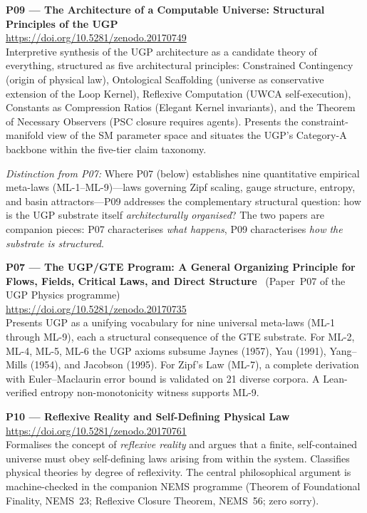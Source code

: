 \documentclass[11pt]{article}
\begin{document}
\medskip
\noindent\textbf{P09 — The Architecture of a Computable Universe: Structural
Principles of the UGP}~\cite{Spivack2025_ArchitectureComputableUniverse}\\
\url{https://doi.org/10.5281/zenodo.20170749}\\
Interpretive synthesis of the UGP architecture as a candidate theory of
everything, structured as five architectural principles: Constrained Contingency
(origin of physical law), Ontological Scaffolding (universe as conservative
extension of the Loop Kernel), Reflexive Computation (UWCA self-execution),
Constants as Compression Ratios (Elegant Kernel invariants), and the Theorem
of Necessary Observers (PSC closure requires agents).  Presents the
constraint-manifold view of the SM parameter space and situates the UGP's
Category-A backbone within the five-tier claim taxonomy.

\textit{Distinction from P07:} Where P07 (below) establishes nine quantitative
empirical meta-laws (ML-1--ML-9)---laws governing Zipf scaling, gauge
structure, entropy, and basin attractors---P09 addresses the complementary
structural question: how is the UGP substrate itself \emph{architecturally
organised}?  The two papers are companion pieces: P07 characterises
\emph{what happens}, P09 characterises \emph{how the substrate is structured}.

\medskip
\noindent\textbf{P07 — The UGP/GTE Program: A General Organizing Principle for
Flows, Fields, Critical Laws, and Direct Structure}~\cite{SpivackZipfLaw}
(Paper~P07 of the UGP Physics programme)\\
\url{https://doi.org/10.5281/zenodo.20170735}\\
Presents UGP as a unifying vocabulary for nine universal meta-laws
(ML-1 through ML-9), each a structural consequence of the GTE substrate.
For ML-2, ML-4, ML-5, ML-6 the UGP axioms subsume Jaynes (1957), Yau (1991),
Yang--Mills (1954), and Jacobson (1995).  For Zipf's Law (ML-7), a complete
derivation with Euler--Maclaurin error bound is validated on 21 diverse corpora.
A Lean-verified entropy non-monotonicity witness supports ML-9.

\medskip
\noindent\textbf{P10 — Reflexive Reality and Self-Defining Physical Law}~\cite{SpivackSelfDefiningUniverse}\\
\url{https://doi.org/10.5281/zenodo.20170761}\\
Formalises the concept of \emph{reflexive reality} and argues that a finite,
self-contained universe must obey self-defining laws arising from within the
system.  Classifies physical theories by degree of reflexivity.  The central
philosophical argument is machine-checked in the companion NEMS programme
(Theorem of Foundational Finality, NEMS~23; Reflexive Closure Theorem,
NEMS~56; zero sorry).
\end{document}
